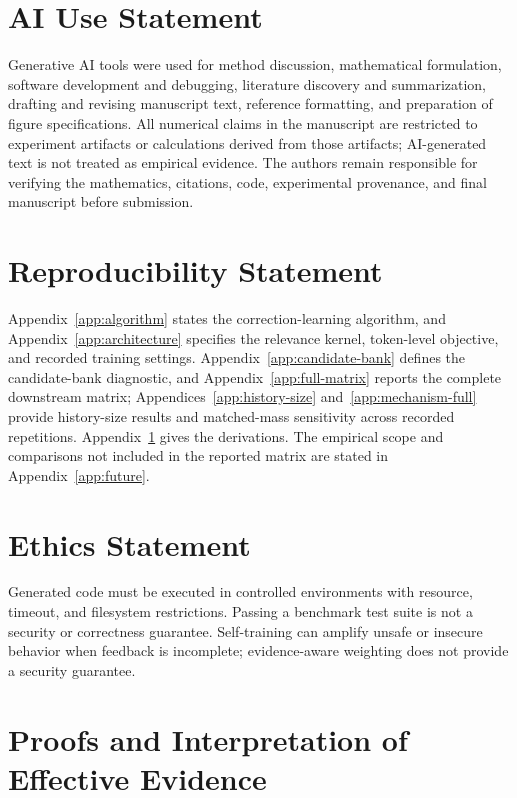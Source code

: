 \documentclass{article}
\begin{document}
\label{pg:main-end}
\clearpage
\section*{AI Use Statement}
\label{pg:statements-start}
Generative AI tools were used for method discussion, mathematical formulation, software development and debugging, literature discovery and summarization, drafting and revising manuscript text, reference formatting, and preparation of figure specifications. All numerical claims in the manuscript are restricted to experiment artifacts or calculations derived from those artifacts; AI-generated text is not treated as empirical evidence. The authors remain responsible for verifying the mathematics, citations, code, experimental provenance, and final manuscript before submission.

\section*{Reproducibility Statement}
Appendix~\ref{app:algorithm} states the correction-learning algorithm, and Appendix~\ref{app:architecture} specifies the relevance kernel, token-level objective, and recorded training settings. Appendix~\ref{app:candidate-bank} defines the candidate-bank diagnostic, and Appendix~\ref{app:full-matrix} reports the complete downstream matrix; Appendices~\ref{app:history-size} and~\ref{app:mechanism-full} provide history-size results and matched-mass sensitivity across recorded repetitions. Appendix~\ref{app:proofs} gives the derivations. The empirical scope and comparisons not included in the reported matrix are stated in Appendix~\ref{app:future}.

\section*{Ethics Statement}
Generated code must be executed in controlled environments with resource, timeout, and filesystem restrictions. Passing a benchmark test suite is not a security or correctness guarantee. Self-training can amplify unsafe or insecure behavior when feedback is incomplete; evidence-aware weighting does not provide a security guarantee.


\clearpage


\clearpage


\appendix

\section{Proofs and Interpretation of Effective Evidence}
\label{app:proofs}
\end{document}
